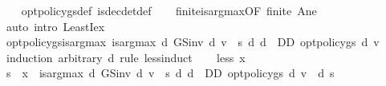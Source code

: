 \begin{isabellebody}
%
\isadelimproof
\ \ %
\endisadelimproof
%
\isatagproof
{}\isamarkupfalse%
\ opt{\isacharunderscore}{\kern0pt}policy{\isacharunderscore}{\kern0pt}gs{\isacharprime}{\kern0pt}{\isacharunderscore}{\kern0pt}def\ is{\isacharunderscore}{\kern0pt}dec{\isacharunderscore}{\kern0pt}det{\isacharunderscore}{\kern0pt}def\isanewline
\ \ \isamarkupfalse%
\ finite{\isacharunderscore}{\kern0pt}is{\isacharunderscore}{\kern0pt}arg{\isacharunderscore}{\kern0pt}max{\isacharbrackleft}{\kern0pt}OF\ finite\ A{\isacharunderscore}{\kern0pt}ne{\isacharbrackright}{\kern0pt}\isanewline
\ \ \isamarkupfalse%
\ {\isacharparenleft}{\kern0pt}auto\ intro{\isacharcolon}{\kern0pt}\ LeastI{}{\isacharunderscore}{\kern0pt}ex{\isacharparenright}{\kern0pt}%
\endisatagproof
{\isafoldproof}%
%
\isadelimproof
\isanewline
%
\endisadelimproof
\isanewline
{}\isamarkupfalse%
\ opt{\isacharunderscore}{\kern0pt}policy{\isacharunderscore}{\kern0pt}gs{\isacharprime}{\kern0pt}{\isacharunderscore}{\kern0pt}is{\isacharunderscore}{\kern0pt}arg{\isacharunderscore}{\kern0pt}max{\isacharcolon}{\kern0pt}\ {\isachardoublequoteopen}is{\isacharunderscore}{\kern0pt}arg{\isacharunderscore}{\kern0pt}max\ {\isacharparenleft}{\kern0pt}{\isasymlambda}d{\isachardot}{\kern0pt}\ GS{\isacharunderscore}{\kern0pt}inv\ d\ v\ {\isachardollar}{\kern0pt}\ s{\isacharparenright}{\kern0pt}\ {\isacharparenleft}{\kern0pt}{\isasymlambda}d{\isachardot}{\kern0pt}\ d\ {\isasymin}\ D\isactrlsub D{\isacharparenright}{\kern0pt}\ {\isacharparenleft}{\kern0pt}opt{\isacharunderscore}{\kern0pt}policy{\isacharunderscore}{\kern0pt}gs{\isacharprime}{\kern0pt}\ d\ v{\isacharparenright}{\kern0pt}{\isachardoublequoteclose}\isanewline
%
\isadelimproof
%
\endisadelimproof
%
\isatagproof
{}\isamarkupfalse%
\ {\isacharparenleft}{\kern0pt}induction\ arbitrary{\isacharcolon}{\kern0pt}\ d\ rule{\isacharcolon}{\kern0pt}\ less{\isacharunderscore}{\kern0pt}induct{\isacharparenright}{\kern0pt}\isanewline
\ \ \isamarkupfalse%
\ {\isacharparenleft}{\kern0pt}less\ x{\isacharparenright}{\kern0pt}\isanewline
\ \ \isamarkupfalse%
\ {\isachardoublequoteopen}s\ {\isacharless}{\kern0pt}\ x\ {\isasymLongrightarrow}\ is{\isacharunderscore}{\kern0pt}arg{\isacharunderscore}{\kern0pt}max\ {\isacharparenleft}{\kern0pt}{\isasymlambda}d{\isachardot}{\kern0pt}\ GS{\isacharunderscore}{\kern0pt}inv\ d\ v\ {\isachardollar}{\kern0pt}\ s{\isacharparenright}{\kern0pt}\ {\isacharparenleft}{\kern0pt}{\isasymlambda}d{\isachardot}{\kern0pt}\ d\ {\isasymin}\ D\isactrlsub D{\isacharparenright}{\kern0pt}\ {\isacharparenleft}{\kern0pt}opt{\isacharunderscore}{\kern0pt}policy{\isacharunderscore}{\kern0pt}gs{\isacharprime}{\kern0pt}\ d\ v{\isacharparenright}{\kern0pt}{\isachardoublequoteclose}\ \ d\ s\isanewline

\end{isabellebody}
